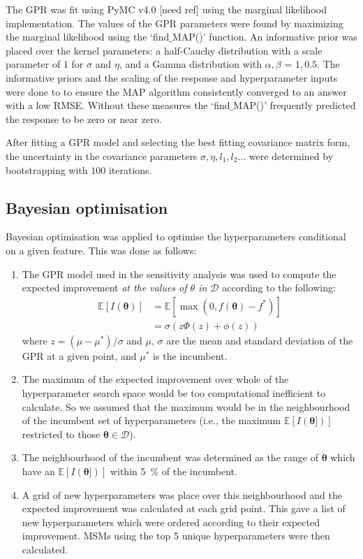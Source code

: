 \documentclass[journal=jacsat,manuscript=article]{achemso}
\begin{document}
The GPR was fit using PyMC v4.0 [need ref] using the marginal likelihood implementation.  The values of the GPR parameters were found by maximizing the marginal likelihood using the `find$\_$MAP()' function. An informative prior was placed over the kernel parameters: a half-Cauchy distribution with a scale parameter of $1$ for $\sigma$ and $\eta$, and a Gamma distribution with $\alpha, \beta$ = $1, 0.5$. The informative priors and the scaling of the response and hyperparameter inputs were done to to ensure the MAP algorithm consistently converged to an answer with a low RMSE. Without these measures the `find$\_$MAP()' frequently predicted the response to be zero or near zero. 

After fitting a GPR model and selecting the best fitting covariance matrix form, the uncertainty in the covariance parameters $\sigma, \eta, l_{1}, l_{2}\ldots$ were determined by bootstrapping with $100$ iterations. 

 
\subsection{Bayesian optimisation}
 
Bayesian optimisation was applied to optimise the hyperparameters conditional on a given feature. This was done as follows: 

\begin{enumerate}
    \item The GPR model used in the sensitivity analysis was used to compute the expected improvement \emph{at the values of $\theta$ in $\mathcal{D}$} according to the following: 
    \begin{align}
     \mathbb{E}[I(\bm{\theta})] &= \mathbb{E}[\max{(0, f(\bm{\theta})-f^{*})}] \label{eqn:ei_def} \\ 
     & = \sigma \left ( z \Phi(z)  + \phi(z) \right) \label{eqn:ei_for_gp}
    \end{align}
    where $z = (\mu-\mu^{*})/\sigma$ and $\mu$, $\sigma$ are the mean and standard deviation of the GPR at a given point, and $\mu^{*}$ is the incumbent. 
    \item The maximum of the expected improvement over whole of the hyperparameter search space would be too computational inefficient to calculate. So we assumed that the maximum would be in the neighbourhood of the incumbent set of hyperparameters (i.e., the maximum $\mathbb{E}[I(\bm{\theta}])]$ restricted to those $\bm{\theta}\in \mathcal{D}$). 
    \item The neighbourhood of the incumbent was determined as the range of $\bm{\theta}$ which have an $\mathbb{E}[I(\bm{\theta}])]$ within \SI{5}{\percent} of the incumbent. 
    \item A grid of new hyperparameters was place over this neighbourhood and the expected improvement was calculated at each grid point.  This gave a list of new hyperparameters which were ordered according to their expected improvement.  MSMs using the top 5 unique hyperparameters were then calculated. 
\end{enumerate}
\end{document}
